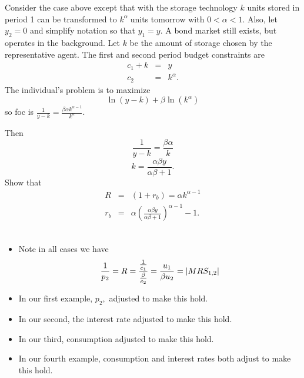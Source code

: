 \documentclass{sebase}
\begin{document}
Consider the case above except that with the storage technology $k$ units
stored in period 1 can be transformed to $k^{\alpha }\;$units tomorrow with $%
0<\alpha <1$. Also, let $y_{2}=0$ and simplify notation so that $y_{1}=y.$ A
bond market still exists, but operates in the background. Let $k$ be the
amount of storage chosen by the representative agent. The first and second
period budget constraints are 
\begin{eqnarray*}
c_{1}+k &=&y \\
c_{2} &=&k^{\alpha }.
\end{eqnarray*}%
The individual's problem is to maximize 
\begin{equation*}
\ln \left( y-k\right) +\beta \ln \left( k^{\alpha }\right)
\end{equation*}%
so foc is $\frac{1}{y-k}=\frac{\beta \alpha k^{\alpha -1}}{k^{\alpha }}.$%
\pagebreak

Then 
\begin{equation*}
\frac{1}{y-k}=\frac{\beta \alpha }{k}
\end{equation*}%
\begin{equation*}
k=\frac{\alpha \beta y}{\alpha \beta +1}.
\end{equation*}%
Show that 
\begin{eqnarray*}
R &=&\left( 1+r_{b}\right) =\alpha k^{\alpha -1} \\
r_{b} &=&\alpha \left( \frac{\alpha \beta y}{\alpha \beta +1}\right)
^{\alpha -1}-1.
\end{eqnarray*}%
$\allowbreak $

\begin{itemize}
\item \pagebreak

Note in all cases we have 
\begin{equation*}
\frac{1}{p_{2}}=R=\frac{\frac{1}{c_{1}}}{\frac{\beta }{c_{2}}}=\frac{u_{1}}{%
\beta u_{2}}=\left\vert MRS_{1,2}\right\vert
\end{equation*}

\item In our first example, $p_{2},$ adjusted to make this hold.

\item In our second, the interest rate adjusted to make this hold.

\item In our third, consumption adjusted to make this hold.

\item In our fourth example, consumption and interest rates both adjust to
make this hold. \pagebreak
\end{itemize}
\end{document}
